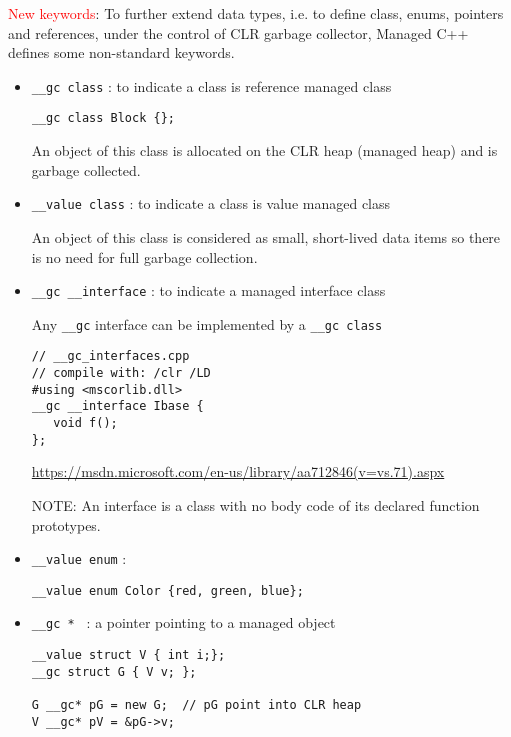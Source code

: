 \textcolor{red}{New keywords}:  To further extend data types, i.e. to define
class, enums, pointers and references, under the control of CLR garbage
collector, Managed C++ defines some non-standard keywords.
\begin{itemize}
  \item \verb!__gc class! : to indicate a class is reference managed class
  
\begin{verbatim}
__gc class Block {};
\end{verbatim}
An object of this class is allocated on the CLR heap (managed heap) and is garbage collected.
  
  \item \verb!__value class! : to indicate a class is value managed class
  
An object of this class is considered as small, short-lived data items so there is no need for full garbage collection.
  
  \item \verb!__gc __interface! : to indicate a managed interface class
  
Any \verb!__gc! interface can be implemented by a \verb!__gc class!
\begin{verbatim}
// __gc_interfaces.cpp
// compile with: /clr /LD
#using <mscorlib.dll>
__gc __interface Ibase { 
   void f(); 
};
\end{verbatim}
\url{https://msdn.microsoft.com/en-us/library/aa712846(v=vs.71).aspx}  

NOTE: An interface is a class with no body code of its declared function prototypes.

  \item \verb!__value enum! : 
  
\begin{verbatim}
__value enum Color {red, green, blue}; 
\end{verbatim}

  \item \verb!__gc * ! : a pointer pointing to a managed object
  
\begin{verbatim}
__value struct V { int i;};
__gc struct G { V v; };

G __gc* pG = new G;  // pG point into CLR heap
V __gc* pV = &pG->v; 

\end{verbatim}  



\end{itemize}
